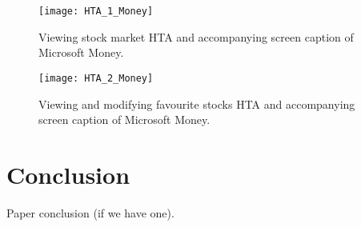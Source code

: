 \documentclass{sigchi}
\begin{document}
\begin{figure*}
	\texttt{[image: HTA\_1\_Money]}
	\caption{Viewing stock market HTA and accompanying screen caption of Microsoft Money.}
	\label{fig:figure1}
\end{figure*}

\begin{figure*}
	\texttt{[image: HTA\_2\_Money]}
	\caption{Viewing and modifying favourite stocks HTA and accompanying screen caption of Microsoft Money.}
	\label{fig:figure2}
\end{figure*}

%
% 
% 

\section{Conclusion}
Paper conclusion (if we have one).

%
%
%
%
%
\balance



\end{document}
